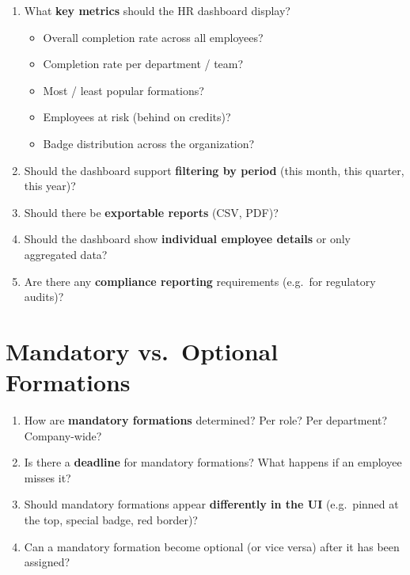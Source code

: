 \documentclass[11pt,a4paper]{article}
\begin{document}
\begin{enumerate}[leftmargin=2em]
  \item What \textbf{key metrics} should the HR dashboard display?
  \begin{itemize}[nosep]
    \item Overall completion rate across all employees?
    \item Completion rate per department / team?
    \item Most / least popular formations?
    \item Employees at risk (behind on credits)?
    \item Badge distribution across the organization?
  \end{itemize}
  \item Should the dashboard support \textbf{filtering by period} (this month, this quarter, this year)?
  \item Should there be \textbf{exportable reports} (CSV, PDF)?
  \item Should the dashboard show \textbf{individual employee details} or only aggregated data?
  \item Are there any \textbf{compliance reporting} requirements (e.g.\ for regulatory audits)?
\end{enumerate}

\section{Mandatory vs.\ Optional Formations}

\begin{enumerate}[leftmargin=2em]
  \item How are \textbf{mandatory formations} determined? Per role? Per department? Company-wide?
  \item Is there a \textbf{deadline} for mandatory formations? What happens if an employee misses it?
  \item Should mandatory formations appear \textbf{differently in the UI} (e.g.\ pinned at the top, special badge, red border)?
  \item Can a mandatory formation become optional (or vice versa) after it has been assigned?
\end{enumerate}

\end{document}
